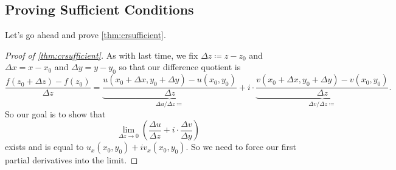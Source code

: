 \documentclass[../notes.tex]{subfiles}
\begin{document}
\subsection{Proving Sufficient Conditions}
Let's go ahead and prove \autoref{thm:crsufficient}.
\begin{proof}[Proof of \autoref{thm:crsufficient}]
	As with last time, we fix $\Delta z\coloneqq z-z_0$ and $\Delta x=x-x_0$ and $\Delta y=y-y_0$ so that our difference quotient is
	\[\frac{f(z_0+\Delta z)-f(z_0)}{\Delta z}=\underbrace{\frac{u(x_0+\Delta x,y_0+\Delta y)-u(x_0,y_0)}{\Delta z}}_{\Delta u/\Delta z\coloneqq }+i\cdot\underbrace{\frac{v(x_0+\Delta x,y_0+\Delta y)-v(x_0,y_0)}{\Delta z}}_{\Delta v/\Delta z\coloneqq }.\]
	So our goal is to show that
	\[\lim_{\Delta z\to0}\left(\frac{\Delta u}{\Delta z}+i\cdot\frac{\Delta v}{\Delta y}\right)\]
	exists and is equal to $u_x(x_0,y_0)+iv_x(x_0,y_0)$. So we need to force our first partial derivatives into the limit.


\end{proof}
\end{document}
